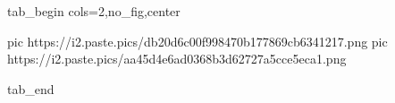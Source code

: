  
 
 
 
 


\ifcmt
  tab_begin cols=2,no_fig,center

     pic https://i2.paste.pics/db20d6c00f998470b177869cb6341217.png
		 pic https://i2.paste.pics/aa45d4e6ad0368b3d62727a5cce5eca1.png

  tab_end
\fi
